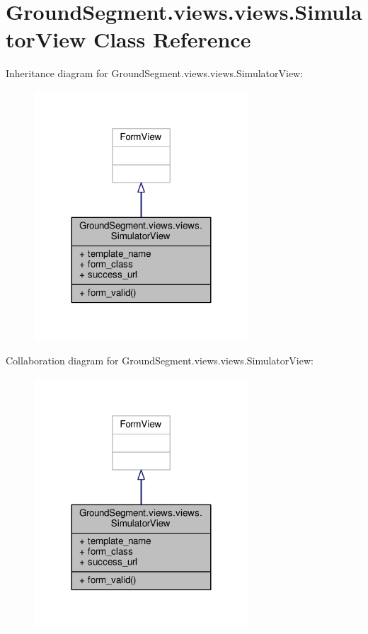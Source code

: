 \hypertarget{class_ground_segment_1_1views_1_1views_1_1_simulator_view}{}\section{Ground\+Segment.\+views.\+views.\+Simulator\+View Class Reference}
\label{class_ground_segment_1_1views_1_1views_1_1_simulator_view}


Inheritance diagram for Ground\+Segment.\+views.\+views.\+Simulator\+View\+:\nopagebreak
\begin{figure}[H]
\begin{center}
\leavevmode
\includegraphics[width=227pt]{class_ground_segment_1_1views_1_1views_1_1_simulator_view__inherit__graph}
\end{center}
\end{figure}


Collaboration diagram for Ground\+Segment.\+views.\+views.\+Simulator\+View\+:\nopagebreak
\begin{figure}[H]
\begin{center}
\leavevmode
\includegraphics[width=227pt]{class_ground_segment_1_1views_1_1views_1_1_simulator_view__coll__graph}
\end{center}
\end{figure}
